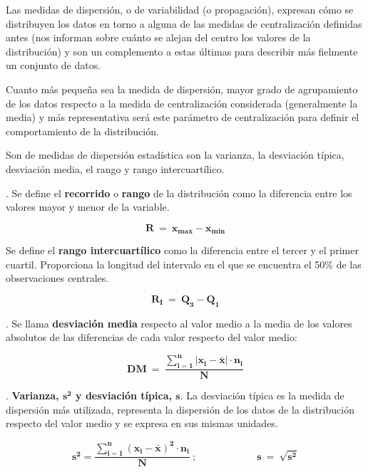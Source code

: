 	Las medidas de dispersión, o de variabilidad (o propagación), expresan cómo se distribuyen los datos en torno a alguna de las medidas de centralización definidas antes (nos informan sobre cuánto se alejan del centro los valores de la distribución) y son un complemento a estas últimas para describir más fielmente un conjunto de datos.
	
	Cuanto más pequeña sea la medida de dispersión, mayor grado de agrupamiento de los datos respecto a la medida de centralización considerada (generalmente la media) y más representativa será este parámetro de centralización para definir el comportamiento de la distribución.
	
	Son de medidas de dispersión estadística son la varianza, la desviación típica, desviación media, el rango y rango intercuartílico. 
	
\vspace{5mm}%
\begin{definition}
	. Se define el \textbf{recorrido} o 	\textbf{rango} de la distribución como la diferencia entre los valores mayor y menor de la variable.
	
	$$\boldsymbol{R\ = \ x_{max}-x_{min}}$$
	
	 Se define	el \textbf{rango intercuartílico} como la diferencia entre el tercer y el primer cuartil. Proporciona la longitud del intervalo en el que se encuentra el 50\% de las observaciones centrales.
	 
	 $$\boldsymbol{R_I\ =\ Q_3-Q_1}$$
\end{definition}

\vspace{5mm}%
\begin{definition}
	. Se llama \textbf{desviación media} respecto al valor medio a la media de los valores absolutos de las diferencias de cada valor respecto del valor medio:
	
	$$\boldsymbol{ DM \ = \ \dfrac { \displaystyle \sum_{i=1}^n |x_i-\bar x|\cdot n_i }{N}  }$$	
\end{definition}

\vspace{5mm}%
\begin{definition}
	. \textbf{Varianza, $\boldsymbol{s^2}$ y desviación típica, $\boldsymbol{s}$}. La desviación típica es la medida de dispersión más utilizada, representa la dispersión de los datos de la distribución respecto del valor medio y se expresa en sus mismas unidades.	
	
	$$\boldsymbol{ s^2=\dfrac {\displaystyle \sum_{i=1}^n (x_i-\bar x)^2\cdot n_i}{N}\ ; \qquad  \qquad \qquad s\ = \ \sqrt{s^2}}$$
\end{definition}


